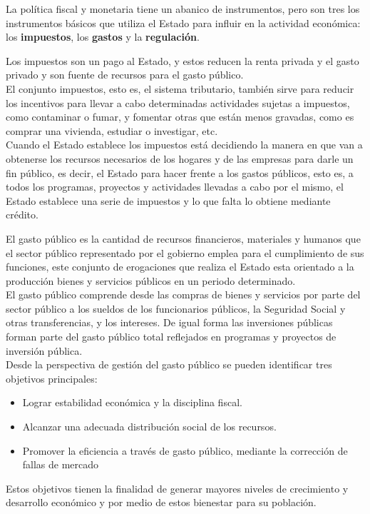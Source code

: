 	La política fiscal y monetaria tiene un abanico de instrumentos, pero son tres los instrumentos básicos que utiliza el Estado para influir en la actividad económica: los \textbf{impuestos}, los	\textbf{gastos} y la \textbf{regulación}.\\
	
	\begin{cajaejercicios1}[Impuestos]
		Los impuestos son un pago al Estado, y estos reducen la renta privada y el gasto privado y son fuente de recursos para el gasto público. \\
		
		El conjunto impuestos, esto es, el sistema tributario,	también sirve para reducir los incentivos para llevar a cabo determinadas actividades sujetas a impuestos,
		como contaminar o fumar, y fomentar otras que están	menos gravadas, como es comprar una vivienda, estudiar	o investigar, etc.\\
				
		Cuando el Estado establece los impuestos está decidiendo la manera en que van a obtenerse los recursos necesarios de los hogares y de las empresas para darle un fin público, es decir, el Estado para hacer frente a los gastos públicos, esto es, a todos	los programas, proyectos y actividades llevadas a cabo por el mismo,
		el Estado establece una serie de impuestos y lo que falta lo obtiene mediante crédito.\\
		
	\end{cajaejercicios1}

	\begin{cajaejercicios1}[Gastos]
		El gasto público es la cantidad de recursos financieros, materiales y humanos que el sector público representado por el gobierno emplea para el cumplimiento de sus funciones, este conjunto de erogaciones que realiza el Estado esta orientado a la producción bienes y servicios públicos en un periodo determinado.\\
		
		El gasto público comprende desde las compras de bienes	y servicios por parte del sector público a los sueldos de los	funcionarios públicos, la Seguridad Social y otras transferencias, y los intereses. De igual forma las inversiones públicas forman parte del gasto público total reflejados en programas y proyectos de inversión pública.\\
		
		Desde la perspectiva de gestión del gasto público se pueden identificar tres objetivos principales:
		\begin{itemize}
			\item Lograr estabilidad económica y la disciplina fiscal.
			\item Alcanzar una adecuada distribución social de los recursos.
			\item Promover la eficiencia a través de gasto público, mediante la corrección de fallas de mercado
		\end{itemize}
	\end{cajaejercicios1}
	Estos objetivos tienen la finalidad de generar mayores niveles de crecimiento y desarrollo económico y por medio de estos bienestar para su población.\\
	
